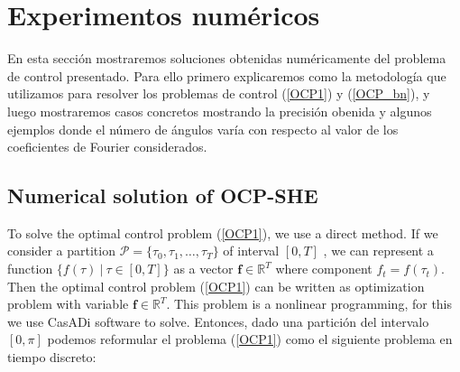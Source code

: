 \section{Experimentos numéricos}



En esta sección mostraremos soluciones obtenidas numéricamente del problema de control presentado. 
%
Para ello primero explicaremos como la metodología que utilizamos para resolver los problemas de control (\ref{OCP1}) y (\ref{OCP_bn}), y luego mostraremos casos concretos mostrando la precisión obenida y algunos ejemplos donde el número de ángulos varía con respecto al valor de los coeficientes de Fourier considerados.

\subsection{Numerical solution of OCP-SHE}

To solve the optimal control problem (\ref{OCP1}), we use a direct method. 
If we consider a partition $\mathcal{P} = \{\tau_0,\tau_1,\dots,\tau_{T}\}$ of interval $[0,T]$ , we can represent a function $\{ f(\tau) \ | \ \tau \in [0,T]\}$ as a vector $\bm{f} \in \mathbb{R}^{T}$ where component $f_t = f(\tau_t)$. Then the optimal control problem (\ref{OCP1}) can be written as optimization problem with variable $\bm{f} \in \mathbb{R}^{T}$. This problem is a nonlinear programming, for this we use CasADi software to solve. Entonces, dado una partición del intervalo $[0,\pi]$ podemos reformular el problema (\ref{OCP1}) como el siguiente problema en tiempo discreto:

